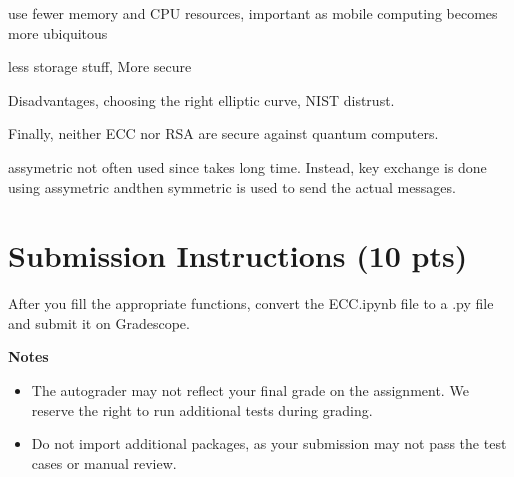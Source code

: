 \documentclass{article}
\begin{document}
use fewer memory and CPU resources, important as mobile computing becomes more ubiquitous


less storage stuff, More secure

Disadvantages, choosing the right elliptic curve, NIST distrust.


Finally, neither ECC nor RSA are secure against quantum computers.

assymetric not often used since takes long time. Instead, key exchange is done using assymetric andthen symmetric is used to send the actual messages.


\section*{Submission Instructions (10 pts)}
    After you fill the appropriate functions, convert the ECC.ipynb file to a .py file and submit it on Gradescope.

    \vspace{3mm}
    \textbf{Notes}
    \begin{itemize}
        \item The autograder may not reflect your final grade on the assignment. We reserve the right to run additional tests during grading.
        \item Do not import additional packages, as your submission may not pass the test cases or manual review.
    \end{itemize}

    
\end{document}
